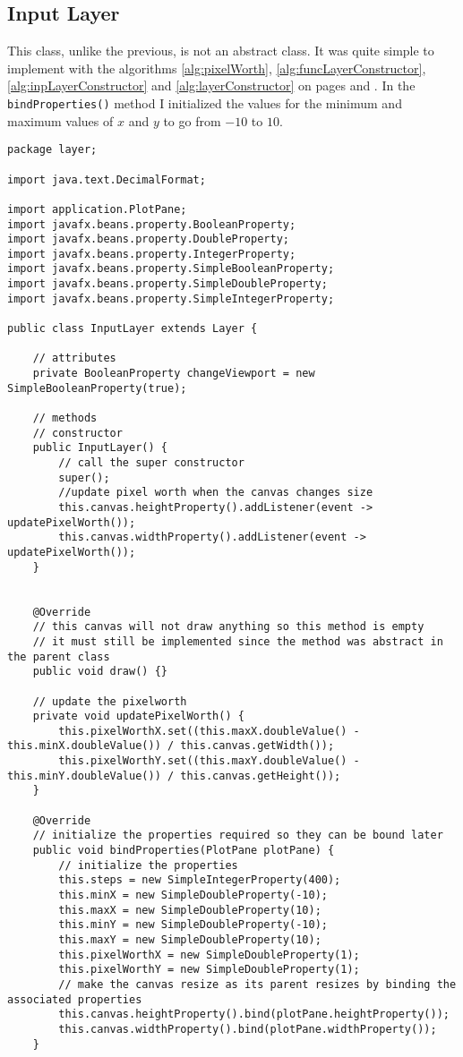 \documentclass[../../../../main.tex]{subfiles}
\begin{document}
\subsection{Input Layer}
This class, unlike the previous, is not an abstract class. It was quite simple to implement with the algorithms \ref{alg:pixelWorth}, \ref{alg:funcLayerConstructor}, \ref{alg:inpLayerConstructor} and \ref{alg:layerConstructor} on pages \pageref{alg:pixelWorth} and \pageref{alg:funcLayerConstructor}. In the \texttt{bindProperties()} method I initialized the values for the minimum and maximum values of $x$ and $y$ to go from $-10$ to $10$.
\begin{verbatim}
package layer;

import java.text.DecimalFormat;

import application.PlotPane;
import javafx.beans.property.BooleanProperty;
import javafx.beans.property.DoubleProperty;
import javafx.beans.property.IntegerProperty;
import javafx.beans.property.SimpleBooleanProperty;
import javafx.beans.property.SimpleDoubleProperty;
import javafx.beans.property.SimpleIntegerProperty;

public class InputLayer extends Layer {
	
	// attributes
	private BooleanProperty changeViewport = new SimpleBooleanProperty(true);
	
	// methods
	// constructor
	public InputLayer() {
		// call the super constructor
		super();
		//update pixel worth when the canvas changes size
		this.canvas.heightProperty().addListener(event -> updatePixelWorth());
		this.canvas.widthProperty().addListener(event -> updatePixelWorth());
	}


	@Override
	// this canvas will not draw anything so this method is empty
	// it must still be implemented since the method was abstract in the parent class
	public void draw() {}
	
	// update the pixelworth
	private void updatePixelWorth() {
		this.pixelWorthX.set((this.maxX.doubleValue() - this.minX.doubleValue()) / this.canvas.getWidth());
		this.pixelWorthY.set((this.maxY.doubleValue() - this.minY.doubleValue()) / this.canvas.getHeight());
	}

	@Override
	// initialize the properties required so they can be bound later
	public void bindProperties(PlotPane plotPane) {
		// initialize the properties
		this.steps = new SimpleIntegerProperty(400);
		this.minX = new SimpleDoubleProperty(-10);
		this.maxX = new SimpleDoubleProperty(10);
		this.minY = new SimpleDoubleProperty(-10);
		this.maxY = new SimpleDoubleProperty(10);
		this.pixelWorthX = new SimpleDoubleProperty(1);
		this.pixelWorthY = new SimpleDoubleProperty(1);
		// make the canvas resize as its parent resizes by binding the associated properties
		this.canvas.heightProperty().bind(plotPane.heightProperty());
		this.canvas.widthProperty().bind(plotPane.widthProperty());
	}
	

\end{verbatim}
\end{document}
